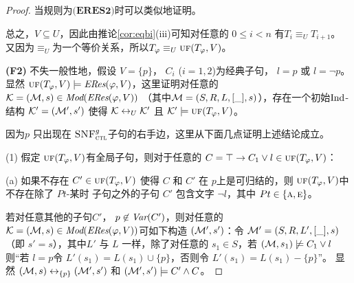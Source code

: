 \begin{proof}
	当规则为$\textbf{(ERES2)}$时可以类似地证明。
	
	总之，$V\subseteq U$，因此由推论\ref{cor:eqbi}(iii)可知对任意的 $0 \leq i < n$ 有$T_i \equiv_U T_{i+1}$。
	又因为$\equiv_U$为一个等价关系，所以$T_{\varphi} \equiv_U \textsc{uf}(T_\varphi,V)$。
	
	
	
	\textbf{(F2)} 不失一般性地，假设 $V=\{p\}$， $C_i$ ($i=1,2$)为经典子句，  $l = p$ 或 $l = \neg p$。
	显然 $\textsc{uf}(T_\varphi,V) \models \emph{ERes}(\varphi,V)$，这里证明对任意的 ${\cal K}=({\cal M}, s)\in \textit{Mod}(\emph{ERes}(\varphi,V))$ （其中${\cal M}=(S, R, L, [\_], s)$），存在一个初始$\textrm{Ind}$-结构 ${\cal K}'=({\cal M}', s')$ 使得 ${\cal K} \leftrightarrow_{U} {\cal K}'$ 且 ${\cal K}' \models \textsc{uf}(T_\varphi,V)$。
	
	
	因为$p$ 只出现在 ${\textsc{SNF}_{\textsc{ctl}}^g}$子句的右手边，这里从下面几点证明上述结论成立。
	
	(1) 假定 $\textsc{uf}(T_\varphi,V)$有全局子句，则对于任意的 $C=\top\rightarrow C_1 \vee l \in \textsc{uf}(T_\varphi,V)$：
	
	(a) 如果不存在 $C'\in \textsc{uf}(T_\varphi,V)$ 使得 $C$ 和 $C'$ 在 $p$上是可归结的，则 $\textsc{uf}(T_\varphi,V)$中不存在除了 $Pt$-某时 子句之外的子句 $C'$ 包含文字 $\neg l$，其中 $Pt\in \{\textsc{a}, \textsc{e}\}$。
	
	若对任意其他的子句$C'$， $p\not \in \textit{Var}(C')$，则对任意的 ${\cal K}=({\cal M}, s)\in \textit{Mod}(\emph{ERes}(\varphi,V))$可如下构造 $({\cal M}',s')$：令 ${\cal M}'= (S, R, L',[\_], s)$ （即 $s'=s$），其中$L'$ 与 $L$ 一样，除了对任意的 $s_1\in S$，若 $({\cal M}, s_1) \not \models C_1 \vee l$则“若 $l=p$令 $L'(s_1) = L(s_1) \cup \{p\}$，否则令 $L'(s_1) = L(s_1) - \{p\}$”。
	显然 $({\cal M}, s) \leftrightarrow_{\{p\}} ({\cal M}', s')$ 和 $({\cal M}', s') \models C' \wedge C$。
	

\end{proof}
